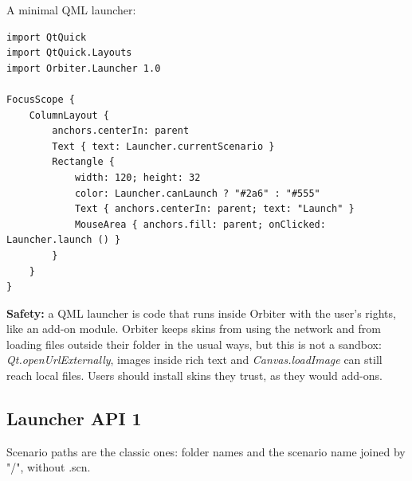 \documentclass[Orbiter Developer Manual.tex]{subfiles}
\begin{document}
\begin{sloppypar}
\noindent
A minimal QML launcher:

\begin{lstlisting}
import QtQuick
import QtQuick.Layouts
import Orbiter.Launcher 1.0

FocusScope {
    ColumnLayout {
        anchors.centerIn: parent
        Text { text: Launcher.currentScenario }
        Rectangle {
            width: 120; height: 32
            color: Launcher.canLaunch ? "#2a6" : "#555"
            Text { anchors.centerIn: parent; text: "Launch" }
            MouseArea { anchors.fill: parent; onClicked: Launcher.launch () }
        }
    }
}
\end{lstlisting}

\noindent
\textbf{Safety:} a QML launcher is code that runs inside Orbiter with the user's rights, like an add-on module. Orbiter keeps skins from using the network and from loading files outside their folder in the usual ways, but this is not a sandbox: \textit{Qt.openUrlExternally}, images inside rich text and \textit{Canvas.loadImage} can still reach local files. Users should install skins they trust, as they would add-ons.


\subsection{Launcher API 1}
\label{ssec:launcher_api}
Scenario paths are the classic ones: folder names and the scenario name joined by "/", without .scn.


\end{sloppypar}
\end{document}
